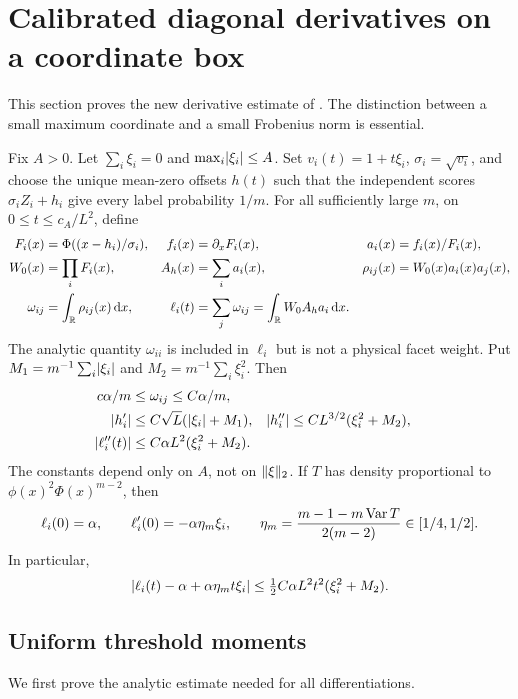 \section{Calibrated diagonal derivatives on a coordinate box}
\label{sec:calibration}
This section proves the new derivative estimate of \cite{hazards}.
The distinction between a small maximum coordinate and a small
Frobenius norm is essential.

\begin{proposition}\label{prop:hazard}
Fix $A>0$. Let $\sum_i\xi_i=0$ and $\max_i\lvert \xi_i\rvert\le A$.
Set $v_i(t)=1+t\xi_i$, $\sigma_i=\sqrt{v_i}$, and choose the unique
mean-zero offsets $h(t)$ such that the independent scores
$\sigma_iZ_i+h_i$ give every label probability $1/m$.
For all sufficiently large $m$, on $0\le t\le c_A/L^2$, define
\begin{align*}
 F_i(x)&=\Phi((x-h_i)/\sigma_i),& f_i(x)&=\partial_xF_i(x),&
 a_i(x)&=f_i(x)/F_i(x),\\
 W_0(x)&=\prod_iF_i(x),& A_h(x)&=\sum_i a_i(x),&
 \rho_{ij}(x)&=W_0(x)a_i(x)a_j(x),\\
 \omega_{ij}&=\int_\mathbb R\rho_{ij}(x)\,\mathrm d x,&
 \ell_i(t)&=\sum_j\omega_{ij}=\int_\mathbb R W_0 A_h a_i\,\mathrm d x.
\end{align*}
The analytic quantity $\omega_{ii}$ is included in $\ell_i$ but is not
a physical facet weight. Put $M_1=m^{-1}\sum_i\lvert \xi_i\rvert$ and
$M_2=m^{-1}\sum_i\xi_i^2$. Then
\begin{align}
 c\alpha/m&\le\omega_{ij}\le C\alpha/m,\label{eq:weightbox}\\
 \lvert h_i'\rvert&\le C\sqrt L(\lvert \xi_i\rvert+M_1),&
 \lvert h_i''\rvert&\le CL^{3/2}(\xi_i^2+M_2),\label{eq:offsetderivatives}\\
 \lvert \ell_i''(t)\rvert&\le C\alpha L^2(\xi_i^2+M_2).
 \label{eq:ell-second}
\end{align}
The constants depend only on $A$, not on $\lVert \xi\rVert_2$.
If $T$ has density proportional to $\phi(x)^2\Phi(x)^{m-2}$, then
\begin{equation}\label{eq:ell-exact}
 \ell_i(0)=\alpha,\qquad
 \ell_i'(0)=-\alpha\eta_m\xi_i,\qquad
 \eta_m=\frac{m-1-m\operatorname{Var} T}{2(m-2)}\in[1/4,1/2].
\end{equation}
In particular,
\begin{equation}\label{eq:ell-Taylor}
 \lvert \ell_i(t)-\alpha+\alpha\eta_m t\xi_i\rvert
       \le \tfrac12 C\alpha L^2t^2(\xi_i^2+M_2).
\end{equation}
\end{proposition}

\subsection{Uniform threshold moments}
We first prove the analytic estimate needed for all differentiations.

